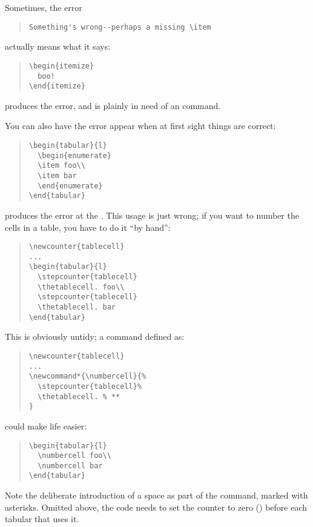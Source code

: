 {

Sometimes, the error
\begin{quote}
\begin{verbatim}
Something's wrong--perhaps a missing \item
\end{verbatim}
\end{quote}
actually means what it says:
\begin{quote}
\begin{verbatim}
\begin{itemize}
  boo!
\end{itemize}
\end{verbatim}
\end{quote}
produces the error, and is plainly in need of an  command.

You can also have the error appear when at first sight things are
correct:
\begin{quote}
\begin{verbatim}
\begin{tabular}{l}
  \begin{enumerate}
  \item foo\\
  \item bar
  \end{enumerate}
\end{tabular}
\end{verbatim}
\end{quote}
produces the error at the \texttt{\bsbs }.  This usage is just wrong; if you
want to number the cells in a table, you have to do it ``by hand'':
\begin{quote}
\begin{verbatim}
\newcounter{tablecell}
...
\begin{tabular}{l}
  \stepcounter{tablecell}
  \thetablecell. foo\\
  \stepcounter{tablecell}
  \thetablecell. bar
\end{tabular}
\end{verbatim}
\end{quote}
This is obviously untidy; a command  defined as:
\begin{quote}
\begin{verbatim}
\newcounter{tablecell}
...
\newcommand*{\numbercell}{%
  \stepcounter{tablecell}%
  \thetablecell. % **
}
\end{verbatim}
\end{quote}
could make life easier:
\begin{quote}
\begin{verbatim}
\begin{tabular}{l}
  \numbercell foo\\
  \numbercell bar
\end{tabular}
\end{verbatim}
\end{quote}
Note the deliberate introduction of a space as part of the command,
marked with asterisks.  Omitted above, the code needs to set the
counter  to zero
() before each tabular that uses it.

}
